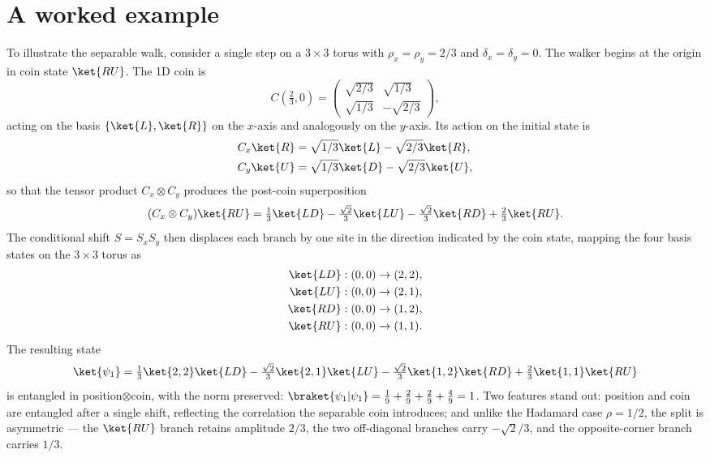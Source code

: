 \section{A worked example}
\label{sec:worked-step}
To illustrate the separable walk, consider a single step on a
$3\times 3$ torus with $\rho_x = \rho_y = 2/3$ and $\delta_x = \delta_y = 0$.
The walker begins at the origin in coin state $\ket{RU}$. The 1D coin is
\begin{equation}
  C\!\left(\tfrac{2}{3}, 0\right) =
  \begin{pmatrix}
    \sqrt{2/3} & \sqrt{1/3} \\
    \sqrt{1/3} & -\sqrt{2/3}
  \end{pmatrix},
\end{equation}
acting on the basis $\{\ket{L},\ket{R}\}$ on the $x$-axis and analogously
on the $y$-axis. Its action on the initial state is
\begin{align}
  C_x\ket{R} &= \sqrt{1/3}\ket{L} - \sqrt{2/3}\ket{R}, \\
  C_y\ket{U} &= \sqrt{1/3}\ket{D} - \sqrt{2/3}\ket{U},
\end{align}
so that the tensor product $C_x \otimes C_y$ produces the post-coin
superposition
\begin{equation}
  (C_x \otimes C_y)\ket{RU} =
    \tfrac{1}{3}\ket{LD}
    - \tfrac{\sqrt{2}}{3}\ket{LU}
    - \tfrac{\sqrt{2}}{3}\ket{RD}
    + \tfrac{2}{3}\ket{RU}.
  \label{eq:worked-coin-output}
\end{equation}
The conditional shift $S = S_x S_y$ then displaces each branch by one
site in the direction indicated by the coin state, mapping the four basis
states on the $3\times 3$ torus as
\begin{align*}
  \ket{LD} &: (0,0) \to (2,2), \\
  \ket{LU} &: (0,0) \to (2,1), \\
  \ket{RD} &: (0,0) \to (1,2), \\
  \ket{RU} &: (0,0) \to (1,1).
\end{align*}
The resulting state
\begin{equation}
  \ket{\psi_1} =
    \tfrac{1}{3}\ket{2,2}\ket{LD}
    - \tfrac{\sqrt{2}}{3}\ket{2,1}\ket{LU}
    - \tfrac{\sqrt{2}}{3}\ket{1,2}\ket{RD}
    + \tfrac{2}{3}\ket{1,1}\ket{RU}
  \label{eq:worked-shifted-state}
\end{equation}
is entangled in position$\otimes$coin, with the norm preserved:
$\braket{\psi_1|\psi_1} = \tfrac{1}{9}+\tfrac{2}{9}+\tfrac{2}{9}+\tfrac{4}{9}=1$.
Two features stand out: position and coin are entangled after a single
shift, reflecting the correlation the separable coin introduces; and
unlike the Hadamard case $\rho=1/2$, the split is asymmetric — the
$\ket{RU}$ branch retains amplitude $2/3$, the two off-diagonal branches
carry $-\sqrt{2}/3$, and the opposite-corner branch carries $1/3$.
